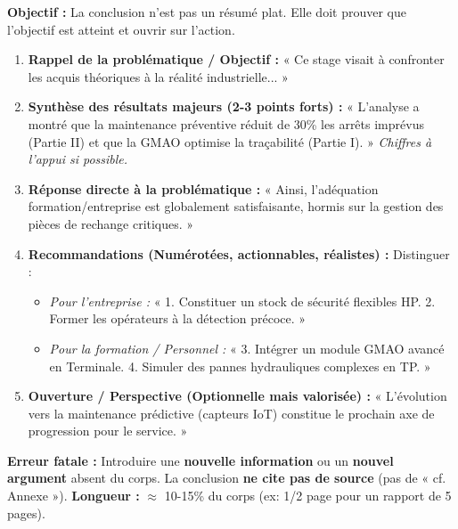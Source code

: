 \documentclass[11pt]{article}
\begin{document}
\begin{methode}
    \textbf{Objectif :} La conclusion n'est pas un résumé plat. Elle doit prouver que l'objectif est atteint et ouvrir sur l'action.
    \begin{enumerate}
        \item \textbf{Rappel de la problématique / Objectif :} « Ce stage visait à confronter les acquis théoriques à la réalité industrielle... »
        \item \textbf{Synthèse des résultats majeurs (2-3 points forts) :} « L'analyse a montré que la maintenance préventive réduit de 30\% les arrêts imprévus (Partie II) et que la GMAO optimise la traçabilité (Partie I). » \emph{Chiffres à l'appui si possible.}
        \item \textbf{Réponse directe à la problématique :} « Ainsi, l'adéquation formation/entreprise est globalement satisfaisante, hormis sur la gestion des pièces de rechange critiques. »
        \item \textbf{Recommandations (Numérotées, actionnables, réalistes) :} Distinguer :
            \begin{itemize}
                \item \emph{Pour l'entreprise :} « 1. Constituer un stock de sécurité flexibles HP. 2. Former les opérateurs à la détection précoce. »
                \item \emph{Pour la formation / Personnel :} « 3. Intégrer un module GMAO avancé en Terminale. 4. Simuler des pannes hydrauliques complexes en TP. »
            \end{itemize}
        \item \textbf{Ouverture / Perspective (Optionnelle mais valorisée) :} « L'évolution vers la maintenance prédictive (capteurs IoT) constitue le prochain axe de progression pour le service. »
    \end{enumerate}
    \textbf{Erreur fatale :} Introduire une \textbf{nouvelle information} ou un \textbf{nouvel argument} absent du corps. La conclusion \textbf{ne cite pas de source} (pas de « cf. Annexe »).
    \textbf{Longueur :} $\approx$ 10-15\% du corps (ex: 1/2 page pour un rapport de 5 pages).
\end{methode}
\end{document}

